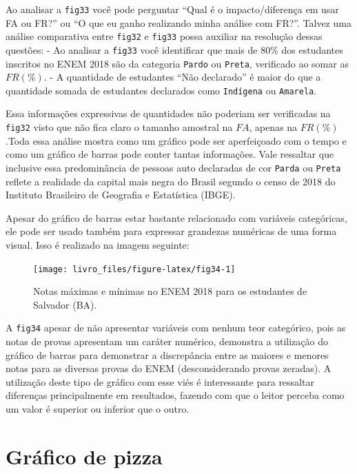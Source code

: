\documentclass[
]{book}
\begin{document}
Ao analisar a \texttt{fig33} você pode perguntar ``Qual é o impacto/diferença em usar FA ou FR?'' ou ``O que eu ganho realizando minha análise com FR?''. Talvez uma análise comparativa entre \texttt{fig32} e \texttt{fig33} possa auxiliar na resolução dessas questões:
- Ao analisar a \texttt{fig33} você identificar que mais de 80\% dos estudantes inscritos no ENEM 2018 são da categoria \texttt{Pardo} ou \texttt{Preta}, verificado ao somar as \(FR(\%)\).
- A quantidade de estudantes ``Não declarado'' é maior do que a quantidade somada de estudantes declarados como \texttt{Indígena} ou \texttt{Amarela}.

Essa informações expressivas de quantidades não poderiam ser verificadas na \texttt{fig32} visto que não fica claro o tamanho amostral na \(FA\), apenas na \(FR(\%)\).Toda essa análise mostra como um gráfico pode ser aperfeiçoado com o tempo e como um gráfico de barras pode conter tantas informações. Vale ressaltar que inclusive essa predominância de pessoas auto declaradas de cor \texttt{Parda} ou \texttt{Preta} reflete a realidade da capital mais negra do Brasil segundo o censo de 2018 do Instituto Brasileiro de Geografia e Estatística (IBGE).

Apesar do gráfico de barras estar bastante relacionado com variáveis categóricas, ele pode ser usado também para expressar grandezas numéricas de uma forma visual. Isso é realizado na imagem seguinte:

\begin{figure}

{\centering \texttt{[image: livro\_files/figure-latex/fig34-1]} 

}

\caption{Notas máximas e mínimas no ENEM 2018 para os estudantes de Salvador (BA).}\label{fig:fig34}
\end{figure}

A \texttt{fig34} apesar de não apresentar variáveis com nenhum teor categórico, pois as notas de provas apresentam um caráter numérico, demonstra a utilização do gráfico de barras para demonstrar a discrepância entre as maiores e menores notas para as diversas provas do ENEM (desconsiderando provas zeradas). A utilização deste tipo de gráfico com esse viés é interessante para ressaltar diferenças principalmente em resultados, fazendo com que o leitor perceba como um valor é superior ou inferior que o outro.

\hypertarget{gruxe1fico-de-pizza}{%
\section{Gráfico de pizza}\label{gruxe1fico-de-pizza}}
\end{document}
